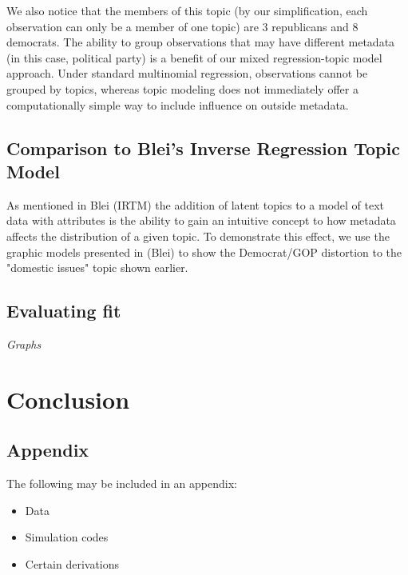 \documentclass[12pt]{article}
\begin{document}
We also notice that the members of this topic (by our simplification, each observation can only be a member of one topic) are 3 republicans and 8 democrats. 
The ability to group observations that may have different metadata (in this case, political party) is a benefit of our mixed regression-topic model approach. 
Under standard multinomial regression, observations cannot be grouped by topics, whereas topic modeling does not immediately offer a computationally simple way to include influence on outside metadata.

\subsection{Comparison to Blei's Inverse Regression Topic Model}
As mentioned in Blei (IRTM) the addition of latent topics to a model of text data with attributes is the ability to gain an intuitive concept to how metadata affects the distribution of a given topic. 
To demonstrate this effect, we use the graphic models presented in (Blei) to show the Democrat/GOP distortion to the "domestic issues"  topic shown earlier. 







\subsection{Evaluating fit}



\emph{Graphs}

\section{Conclusion}\label{conclusion}







\newpage

\begin{appendix}
\section{Appendix}

\vspace{4mm}\noindent 
The following may be included in an appendix:

\begin{itemize}
\item[] Data 
\item[] Simulation codes
\item[] Certain derivations
\end{itemize}
\end{appendix}
\newpage
\end{document}
